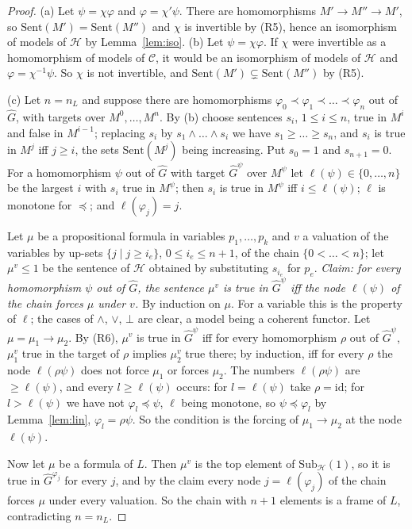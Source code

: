 \documentclass[11pt]{amsart}
\theoremstyle{definition}
\newcommand{\Sub}{\mathrm{Sub}}
\newcommand{\Sent}{\mathrm{Sent}}
\newcommand{\cC}{\mathcal C}
\newcommand{\cH}{\mathcal H}
\newcommand{\id}{\mathrm{id}}
\begin{document}
\begin{proof}
(a) Let $\psi=\chi\varphi$ and $\varphi=\chi'\psi$. There are
homomorphisms $M'\to M''\to M'$, so $\Sent(M')=\Sent(M'')$ and $\chi$
is invertible by (R5), hence an isomorphism of models of $\cH$ by
Lemma~\ref{lem:iso}. (b) Let $\psi=\chi\varphi$. If $\chi$ were
invertible as a homomorphism of models of $\cC$, it would be an
isomorphism of models of $\cH$ and $\varphi=\chi^{-1}\psi$. So $\chi$
is not invertible, and $\Sent(M')\subsetneq\Sent(M'')$ by (R5).

(c) Let $n=n_L$ and suppose there are homomorphisms $\varphi_0\prec
\varphi_1\prec\dots\prec\varphi_n$ out of $\hat G$, with targets over
$M^0,\dots,M^n$. By (b) choose sentences $s_i$, $1\le i\le n$, true in
$M^i$ and false in $M^{i-1}$; replacing $s_i$ by $s_1\wedge\dots\wedge
s_i$ we have $s_1\ge\dots\ge s_n$, and $s_i$ is true in $M^j$ iff
$j\ge i$, the sets $\Sent(M^j)$ being increasing. Put $s_0=1$ and
$s_{n+1}=0$. For a homomorphism $\psi$ out of $\hat G$ with target
$\hat G^\psi$ over $M^\psi$ let $\ell(\psi)\in\{0,\dots,n\}$ be the
largest $i$ with $s_i$ true in $M^\psi$; then $s_i$ is true in
$M^\psi$ iff $i\le\ell(\psi)$; $\ell$ is monotone for $\preceq$; and
$\ell(\varphi_j)=j$.

Let $\mu$ be a propositional formula in variables $p_1,\dots,p_k$ and
$v$ a valuation of the variables by up-sets $\{j\mid j\ge i_e\}$,
$0\le i_e\le n+1$, of the chain $\{0<\dots<n\}$; let $\mu^v\le1$ be
the sentence of $\cH$ obtained by substituting $s_{i_e}$ for $p_e$.
\emph{Claim: for every homomorphism $\psi$ out of $\hat G$, the
sentence $\mu^v$ is true in $\hat G^\psi$ iff the node $\ell(\psi)$ of
the chain forces $\mu$ under $v$.} By induction on $\mu$. For a
variable this is the property of $\ell$; the cases of $\wedge$,
$\vee$, $\bot$ are clear, a model being a coherent functor. Let
$\mu=\mu_1\to\mu_2$. By (R6), $\mu^v$ is true in $\hat G^\psi$ iff for
every homomorphism $\rho$ out of $\hat G^\psi$, $\mu_1^v$ true in the
target of $\rho$ implies $\mu_2^v$ true there; by induction, iff for
every $\rho$ the node $\ell(\rho\psi)$ does not force $\mu_1$ or
forces $\mu_2$. The numbers $\ell(\rho\psi)$ are $\ge\ell(\psi)$, and
every $l\ge\ell(\psi)$ occurs: for $l=\ell(\psi)$ take $\rho=\id$; for
$l>\ell(\psi)$ we have not $\varphi_l\preceq\psi$, $\ell$ being
monotone, so $\psi\preceq\varphi_l$ by Lemma~\ref{lem:lin},
$\varphi_l=\rho\psi$. So the condition is the forcing of
$\mu_1\to\mu_2$ at the node $\ell(\psi)$.

Now let $\mu$ be a formula of $L$. Then $\mu^v$ is the top element of
$\Sub_\cH(1)$, so it is true in $\hat G^{\varphi_j}$ for every $j$,
and by the claim every node $j=\ell(\varphi_j)$ of the chain forces
$\mu$ under every valuation. So the chain with $n+1$ elements is a
frame of $L$, contradicting $n=n_L$.
\end{proof}
\end{document}
